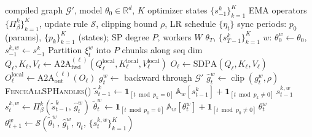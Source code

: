 \documentclass{article}
\begin{document}
\begin{algorithm}[ht]
\caption{FAUST Runtime Training with Tiered Communication}
\label{alg:desloc}
\begin{algorithmic}[1]
\REQUIRE compiled graph $\mathcal{G}'$, model $\theta_0 \in \mathbb{R}^d$, $K$ optimizer states $\{s^k_{-1}\}_{k=1}^K$
\REQUIRE EMA operators $\{\Pi_{\!\beta}^k\}_{k=1}^K$, update rule $\mathcal{S}$, clipping bound $\rho$, LR schedule $\{\eta_t\}$
\REQUIRE sync periods: $p_0$ (params), $\{p_k\}_{k=1}^K$ (states); SP degree $P$, workers $W$
$\theta_T$, $\{s^k_{T-1}\}_{k=1}^K$
\STATE $w$: $\theta^w_0 \gets \theta_0$, $s^{k,w}_{-1} \gets s^k_{-1}$ 
        \STATE {}
        \STATE Partition $\xi^w_t$ into $P$ chunks along seq dim 
            \STATE $Q_\ell, K_\ell, V_\ell \gets \text{A2A}_{\text{fwd}}^{(\ell)}(Q_\ell^{\text{local}}, K_\ell^{\text{local}}, V_\ell^{\text{local}})$ \COMMENT{$[B,N,\frac{S}{P},H] \!\to\! [B,\frac{N}{P},S,H]$}
            \STATE $O_\ell \gets \text{SDPA}(Q_\ell, K_\ell, V_\ell)$ 
            \STATE $O_\ell^{\text{local}} \gets \text{A2A}_{\text{out}}^{(\ell)}(O_\ell)$ \COMMENT{$[B,\frac{N}{P},S,H] \!\to\! [B,N,\frac{S}{P},H]$}
        \ENDFOR
        \STATE $g^w_t \gets$ backward through $\mathcal{G}'$ 
        \STATE $\hat{g}^w_t \gets \operatorname{clip}(g^w_t, \rho)$ 
        \STATE {}
            \STATE \textsc{FenceAllSPHandles}() 
        \ENDIF
        \STATE {}
            \STATE $\tilde{s}^{k}_{t-1} \gets \mathbf{1}_{[t \bmod p_k = 0]}\,\mathbb{A}_w[s^{k}_{t-1}] + \mathbf{1}_{[t \bmod p_k \neq 0]}\,s^{k,w}_{t-1}$ 
            \STATE $s^{k,w}_t \gets \Pi_{\!\beta}^k\!\left(\tilde{s}^{k}_{t-1},\, \hat{g}^w_t\right)$ 
        \ENDFOR
        \STATE $\tilde{\theta}^w_t \gets \mathbf{1}_{[t \bmod p_0 = 0]}\,\mathbb{A}_w[\theta^w_t] + \mathbf{1}_{[t \bmod p_0 \neq 0]}\,\theta^w_t$ 
        \STATE $\theta^w_{t+1} \gets \mathcal{S}\!\left(\tilde{\theta}^w_t,\, \hat{g}^w_t,\, \eta_t,\, \{s^{k,w}_t\}_{k=1}^K\right)$ 
    \ENDFOR
\ENDFOR
\end{algorithmic}
\end{algorithm}
\end{document}

